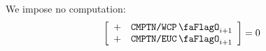 We impose no computation:
\[
	\left[ \begin{array}{cl}
		+ & \computationWcpFlag _{i + 1} \\
		+ & \computationEucFlag _{i + 1} \\
	\end{array} \right]
	= 0
\]
